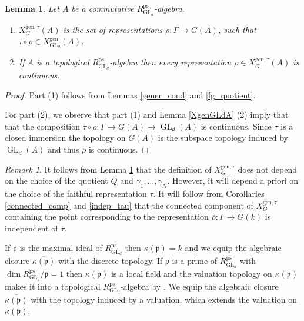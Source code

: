 \documentclass{amsart}
\newtheorem{lem}[prop]{Lemma}
\theoremstyle{definition}
\theoremstyle{remark}
\newtheorem{remar}[prop]{Remark}
\DeclareMathOperator{\GL}{GL}
\newcommand{\pp}{\mathfrak p}
\newcommand{\rhobar}{\overline{\rho}}
\newcommand{\ps}{\mathrm{ps}}
\newcommand{\gen}{\mathrm{gen}}
\newcommand{\RpsGLd}{R^{\ps}_{\GL_d}}
\newcommand{\XgenGLd}{X^{\gen}_{\GL_d}}
\newcommand{\XgenGtau}{X^{\gen, \tau}_G}
\begin{document}
\begin{lem}\label{XgenGA} Let $A$ be a commutative $\RpsGLd$-algebra.
\begin{enumerate}
    \item $\XgenGtau(A)$ is the set of representations $\rho: \Gamma \rightarrow G(A)$, such that 
    $\tau\circ \rho \in \XgenGLd(A)$.
    \item If $A$ is a topological $\RpsGLd$-algebra then every representation $\rho \in \XgenGtau(A)$ is continuous.
\end{enumerate}
\end{lem}

\begin{proof} Part (1) follows from Lemmas \ref{gener_cond} and \ref{fg_quotient}.

    
    For part (2), we observe that part (1) and Lemma \ref{XgenGLdA} (2) imply that
    that the composition $\tau \circ \rho : \Gamma \to G(A) \to \GL_d(A)$ is continuous.
    Since $\tau$ is a closed immersion the topology on $G(A)$ is the subspace topology
    induced by $\GL_d(A)$ and thus $\rho$ is continuous.
  \end{proof}

\begin{remar} It follows from Lemma \ref{XgenGA}
that the definition of $\XgenGtau$ does not depend
on the choice of the quotient $Q$ and $\gamma_1, \ldots, \gamma_N$. However, it will depend a priori on the choice of the faithful representation $\tau$. It will follow from Corollaries \ref{connected_comp} and \ref{indep_tau}
that the connected component of $X^{\gen, \tau}_G$ containing the point corresponding to the representation $\rhobar: \Gamma \rightarrow G(k)$ is 
independent of $\tau$. 
\end{remar}

If $\pp$ is the maximal ideal of $\RpsGLd$ then $\kappa(\pp)=k$ and we equip the algebraic closure 
$\overline{\kappa(\pp)}$ with the discrete topology. If $\pp$ is a prime of   $\RpsGLd$ with $\dim \RpsGLd/\pp =1$ then 
$\kappa(\pp)$ is a local field and the valuation topology on $\kappa(\pp)$ makes it 
into a topological $\RpsGLd$-algebra by \cite[Lemma 3.17]{BIP_new}. We equip
the algebraic closure $\overline{\kappa(\pp)}$ with the topology induced by a valuation, which 
extends the valuation on $\kappa(\pp)$. 
\end{document}
